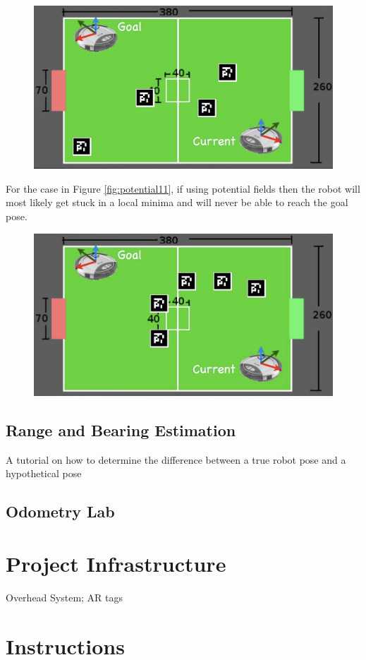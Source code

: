 \begin{figure}[!h]
\centering
\includegraphics[width=0.6\columnwidth]{figures/7_potential10.jpg}
\label{fig:7_potential10}
\end{figure}

For the case in Figure \ref{fig:potential11}, if using potential fields then the robot will most likely get stuck in a local minima and will never be able to reach the goal pose.

\begin{figure}[!h]
\centering
\includegraphics[width=0.6\columnwidth]{figures/7_potential11.jpg}
\label{fig:7_potential11}
\end{figure}


\subsection{Range and Bearing Estimation}

A tutorial on how to determine the difference between a true robot pose and a hypothetical pose

\subsection{Odometry Lab}

\section{Project Infrastructure}

Overhead System; AR tags

\section{Instructions}

